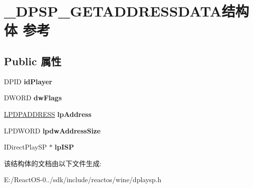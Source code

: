 \hypertarget{struct___d_p_s_p___g_e_t_a_d_d_r_e_s_s_d_a_t_a}{}\section{\+\_\+\+D\+P\+S\+P\+\_\+\+G\+E\+T\+A\+D\+D\+R\+E\+S\+S\+D\+A\+T\+A结构体 参考}
\label{struct___d_p_s_p___g_e_t_a_d_d_r_e_s_s_d_a_t_a}
\subsection*{Public 属性}
\begin{DoxyCompactItemize}
\item 
\mbox{\label{struct___d_p_s_p___g_e_t_a_d_d_r_e_s_s_d_a_t_a_ad7f2600402a9155b905b904d80230886}} 
D\+P\+ID {\bfseries id\+Player}
\item 
\mbox{\label{struct___d_p_s_p___g_e_t_a_d_d_r_e_s_s_d_a_t_a_ac858f2cbf5b4ff4b68432536ee50a820}} 
D\+W\+O\+RD {\bfseries dw\+Flags}
\item 
\mbox{\label{struct___d_p_s_p___g_e_t_a_d_d_r_e_s_s_d_a_t_a_a9d93cffe2e29ea6ca9eee89f6bb6288d}} 
\hyperlink{structtag_d_p_a_d_d_r_e_s_s}{L\+P\+D\+P\+A\+D\+D\+R\+E\+SS} {\bfseries lp\+Address}
\item 
\mbox{\label{struct___d_p_s_p___g_e_t_a_d_d_r_e_s_s_d_a_t_a_afb9c90c48f65039239115262605ea530}} 
L\+P\+D\+W\+O\+RD {\bfseries lpdw\+Address\+Size}
\item 
\mbox{\label{struct___d_p_s_p___g_e_t_a_d_d_r_e_s_s_d_a_t_a_acbf9279dd0aeec4bf944b2a799bfe107}} 
I\+Direct\+Play\+SP $\ast$ {\bfseries lp\+I\+SP}
\end{DoxyCompactItemize}


该结构体的文档由以下文件生成\+:\begin{DoxyCompactItemize}
\item 
E\+:/\+React\+O\+S-\/0../sdk/include/reactos/wine/dplaysp.\+h\end{DoxyCompactItemize}
